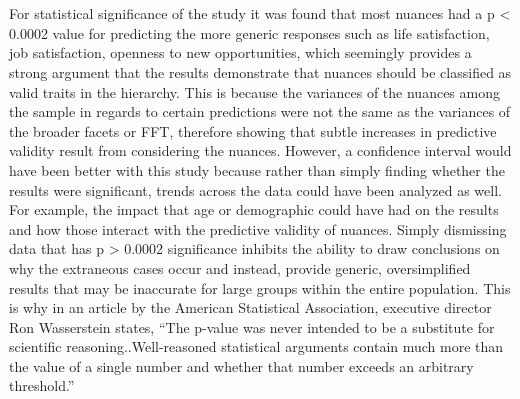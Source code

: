 \documentclass[letterpaper, 12 pt, conference]{article}
\begin{document}
\begin{enumerate}
\\
\\
For statistical significance of the study it was found that most nuances had a p < 0.0002 value for predicting the more generic responses such as life satisfaction, job satisfaction, openness to new opportunities, which seemingly provides a strong argument that the results demonstrate that nuances should be classified as valid traits in the hierarchy. This is because the variances of the nuances among the sample in regards to certain predictions were not the same as the variances of the broader facets or FFT, therefore showing that subtle increases in predictive validity result from considering the nuances. However, a confidence interval would have been better with this study because rather than simply finding whether the results were significant, trends across the data could have been analyzed as well. For example, the impact that age or demographic could have had on the results and how those interact with the predictive validity of nuances. Simply dismissing data that has p > 0.0002 significance inhibits the ability to draw conclusions on why the extraneous cases occur and instead, provide generic, oversimplified results that may be inaccurate for large groups within the entire population. This is why in an article by the American Statistical Association, executive director Ron Wasserstein states, “The p-value was never intended to be a substitute for scientific reasoning..Well-reasoned statistical arguments contain much more than the value of a single number and whether that number exceeds an arbitrary threshold.”
    \\
\end{enumerate}
\end{document}

